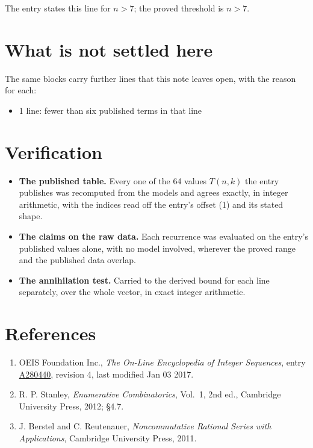 \documentclass[11pt]{article}
\theoremstyle{definition}
\begin{document}
The entry states this line for $n > 7$; the proved threshold is $n > 7$.

\section{What is not settled here}

The same blocks carry further lines that this note leaves open, with the reason for each:

\begin{itemize}

\item 1 line: fewer than six published terms in that line

\end{itemize}

\section{Verification}

\begin{itemize}

\item {\bfseries The published table.} Every one of the 64 values $T(n,k)$ the entry publishes was recomputed from the models and agrees exactly, in integer arithmetic, with the indices read off the entry's offset (1) and its stated shape.

\item {\bfseries The claims on the raw data.} Each recurrence was evaluated on the entry's published values alone, with no model involved, wherever the proved range and the published data overlap.

\item {\bfseries The annihilation test.} Carried to the derived bound for each line separately, over the whole vector, in exact integer arithmetic.

\end{itemize}

\section{References}

\begin{enumerate}

\item OEIS Foundation Inc., \emph{The On-Line Encyclopedia of Integer Sequences}, entry \href{https://oeis.org/A280440}{A280440}, revision 4, last modified Jan 03 2017.

\item R. P. Stanley, \emph{Enumerative Combinatorics}, Vol.~1, 2nd ed., Cambridge University Press, 2012; \S4.7.

\item J. Berstel and C. Reutenauer, \emph{Noncommutative Rational Series with Applications}, Cambridge University Press, 2011.

\end{enumerate}
\end{document}
